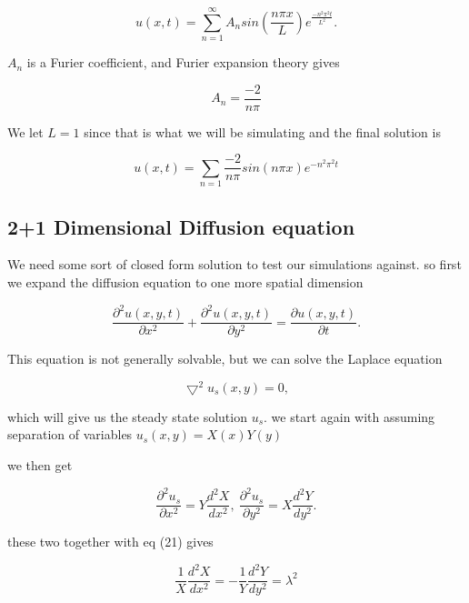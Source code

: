 \documentclass[english,a4paper,12pt]{article}
\begin{document}
\begin{equation}
 u(x,t) =\sum_{n=1}^{\infty} A_n sin(\frac{n \pi x}{L}) e^{\frac{-n^2 \pi^2 t}{L^2}}.
\end{equation}

$A_n$ is a Furier coefficient, and Furier expansion theory gives

\begin{equation}
 A_n = \frac{-2}{n \pi}
\end{equation}

We let $L = 1$ since that is what we will be simulating and the final solution is

\begin{equation}
u(x,t) = \sum_{n=1} \frac{-2}{n \pi} sin(n \pi x)  e^{-n^2 \pi^2 t}
\end{equation}

\subsection*{2+1 Dimensional Diffusion equation}

We need some sort of closed form solution to test our simulations against. so first we expand the diffusion equation to one more spatial
dimension

\begin{equation}
 \frac{\partial^2 u(x,y,t)}{\partial x^2} + \frac{\partial^2 u(x,y,t)}{\partial y^2} = \frac{\partial u(x,y,t)}{\partial t}.
\end{equation}

This equation is not generally solvable, but we can solve the Laplace equation

\begin{equation}
 \bigtriangledown^2 u_{s}(x,y) = 0,
\end{equation}

which will give us the steady state solution $u_s$. we start again with assuming separation of variables $u_{s}(x,y) = X(x)Y(y)$

we then get 

\begin{equation}
 \frac{\partial^2 u_s}{\partial x^2} = Y \frac{d^2 X}{dx^2},\  \frac{\partial^2 u_s}{\partial y^2} = X \frac{d^2 Y}{dy^2}. 
\end{equation}

these two together with eq (21) gives

\begin{equation}
 \frac{1}{X}\frac{d^2 X}{dx^2} = -\frac{1}{Y}\frac{d^2 Y}{dy^2} = \lambda^2
\end{equation}
\end{document}
